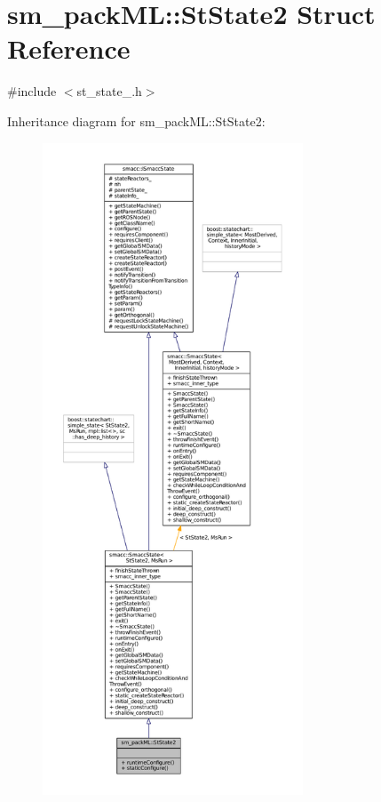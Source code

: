 \hypertarget{structsm__packML_1_1StState2}{}\section{sm\+\_\+pack\+ML\+:\+:St\+State2 Struct Reference}
\label{structsm__packML_1_1StState2}


{\ttfamily \#include $<$st\+\_\+state\+\_.\+h$>$}



Inheritance diagram for sm\+\_\+pack\+ML\+:\+:St\+State2\+:
\nopagebreak
\begin{figure}[H]
\begin{center}
\leavevmode
\includegraphics[height=550pt]{structsm__packML_1_1StState2__inherit__graph}
\end{center}
\end{figure}


